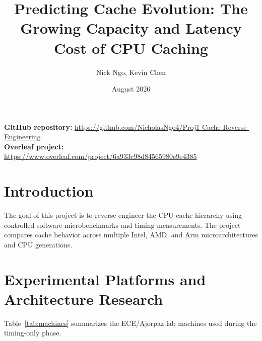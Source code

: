 \documentclass{article}
\title{Predicting Cache Evolution: The Growing Capacity and Latency Cost of CPU Caching}
\author{Nick Ngo, Kevin Chen}
\date{August 2026}
\begin{document}
\maketitle

\begin{center}
\textbf{GitHub repository:} \url{https://github.com/NicholasNgo4/Proj1-Cache-Reverse-Engineering}\\
\textbf{Overleaf project:} \url{https://www.overleaf.com/project/6a933c98d84565980e9e4385}
\end{center}

\section{Introduction}

The goal of this project is to reverse engineer the CPU cache hierarchy using controlled software microbenchmarks and timing measurements. The project compares cache behavior across multiple Intel, AMD, and Arm microarchitectures and CPU generations.

\section{Experimental Platforms and Architecture Research}
\label{sec:platforms}

Table~\ref{tab:machines} summarizes the ECE/Ajorpaz lab machines used during the timing-only phase.
\end{document}
